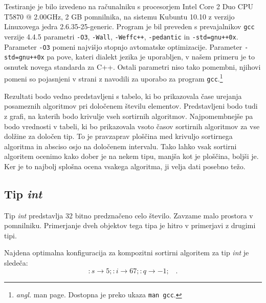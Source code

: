 \documentclass[a4paper,oneside,12pt]{article}
\newcommand{\lra}{\ensuremath{\longrightarrow}}
\newcommand{\edot}{\;\;\;.}
\begin{document}
Testiranje je bilo izvedeno na računalniku s procesorjem Intel\textregistered{} Core\texttrademark{}
2 Duo CPU T5870 @ 2.00GHz, 2 GB pomnilnika, na sistemu Kubuntu 10.10 z verzijo Linuxovega jedra 2.6.35-25-generic.
Program je bil preveden s prevajalnikov \texttt{gcc} verzije 4.4.5 parametri \texttt{-O3},
\texttt{-Wall}, \texttt{-Weffc++}, \texttt{-pedantic} in \texttt{-std=gnu++0x}.
Parameter \texttt{-O3} pomeni najvišjo stopnjo avtomatske optimizacije. Parameter \texttt{-std=gnu++0x} 
pa pove, kateri dialekt jezika je uporabljen, v našem primeru je to osnutek novega standarda za C++.
Ostali parametri niso tako pomembni, njihovi pomeni so pojasnjeni v strani z navodili za uporabo za program 
\texttt{gcc}.\footnote{\emph{angl.} man page. Dostopna je preko ukaza \texttt{man gcc}.}

Rezultati bodo vedno predstavljeni s tabelo, ki bo prikazovala čase urejanja
posameznih algoritmov pri določenem številu elementov. Predstavljeni bodo tudi z
grafi, na katerih bodo krivulje vseh sortirnih algoritmov. Najpomembnejše pa
bodo vrednosti v tabeli, ki bo prikazovala vsoto časov sortirnih algoritmov za
vse dolžine za določen tip. To je pravzaprav ploščina med krivuljo sortirnega
algoritma in absciso osjo na določenem intervalu. Tako lahko vsak sortirni
algoritem ocenimo kako dober je na nekem tipu, manjša kot je ploščina, boljši
je. Ker je to najbolj splošna ocena vsakega algoritma, ji velja dati posebno
težo.  
 
\subsection{Tip \emph{int}}
\label{chapter:rez:int}
Tip \emph{int} predstavlja 32 bitno predznačeno celo število. Zavzame malo prostora v 
pomnilniku. Primerjanje dveh objektov tega tipa je hitro v primerjavi z drugimi tipi.

Najdena optimalna konfiguracija za kompozitni sortirni algoritem za tip \emph{int} je sledeča:
\[ :s \lra 5;:i \lra 67;:q \lra -1; \edot \]
\end{document}
